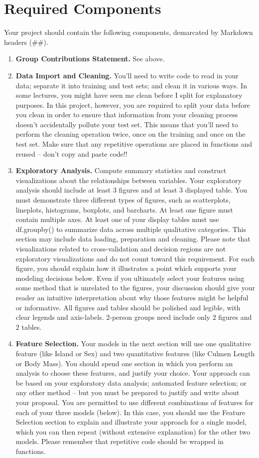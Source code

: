 \documentclass[12pt]{article}
\begin{document}
\section{Required Components}
Your project should contain the following components, demarcated by Markdown headers (\#\#).
\begin{enumerate}
\item {\bf Group Contributions Statement.} See above.
\item {\bf Data Import and Cleaning.} You’ll need to write code to read in your data; separate it into training and test sets; and clean it in various ways. In some lectures, you might have seen me clean before I split for explanatory purposes. In this project, however, you are required to split your data before you clean in order to ensure that information from your cleaning process doesn’t accidentally pollute your test set. This means that you’ll need to perform the cleaning operation twice, once on the training and once on the test set. Make sure that any repetitive operations are placed in functions and reused – don’t copy and paste code!!
\item {\bf Exploratory Analysis.} Compute summary statistics and construct visualizations about the relationships between variables. Your exploratory analysis should include at least 3 figures and at least 3 displayed table. You must demonstrate three different types of figures, such as scatterplots, lineplots, histograms, boxplots, and barcharts. At least one figure must contain multiple axes. At least one of your display tables must use df.groupby() to summarize data across multiple qualitative categories. This section may include data loading, preparation and cleaning. Please note that visualizations related to cross-validation and decision regions are not exploratory visualizations and do not count toward this requirement. For each figure, you should explain how it illustrates a point which supports your modeling decisions below. Even if you ultimately select your features using some method that is unrelated to the figures, your discussion should give your reader an intuitive interpretation about why those features might be helpful or informative. All figures and tables should be polished and legible, with clear legends and axis-labels. 2-person groups need include only 2 figures and 2 tables.
\item {\bf Feature Selection.} Your models in the next section will use one qualitative feature (like Island or Sex) and two quantitative features (like Culmen Length or Body Mass). You should spend one section in which you perform an analysis to choose these features, and justify your choice. Your approach can be based on your exploratory data analysis; automated feature selection; or any other method – but you must be prepared to justify and write about your proposal. You are permitted to use different combinations of features for each of your three models (below). In this case, you should use the Feature Selection section to explain and illustrate your approach for a single model, which you can then repeat (without extensive explanation) for the other two models. Please remember that repetitive code should be wrapped in functions.

\end{enumerate}
\end{document}
